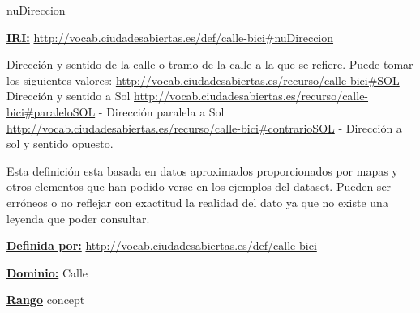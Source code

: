 \begin{mybox}{nuDireccion}
\begin{flushleft}
\underline{\textbf{IRI:}}
\url{http://vocab.ciudadesabiertas.es/def/calle-bici#nuDireccion}
\newline

Dirección y sentido de la calle o tramo de la calle a la que se refiere.
Puede tomar los siguientes valores:
\newline \url{http://vocab.ciudadesabiertas.es/recurso/calle-bici#SOL} - Dirección y sentido a Sol
\newline \url{http://vocab.ciudadesabiertas.es/recurso/calle-bici#paraleloSOL} - Dirección paralela a Sol
\newline \url{http://vocab.ciudadesabiertas.es/recurso/calle-bici#contrarioSOL} - Dirección a sol y sentido opuesto.
\newline

Esta definición esta basada en datos aproximados proporcionados por mapas y otros elementos que han podido verse en los ejemplos del dataset. Pueden ser erróneos o no reflejar con exactitud la realidad del dato ya que no existe una leyenda que poder consultar.
\newline



\underline{\textbf{Definida por:}}
\url{http://vocab.ciudadesabiertas.es/def/calle-bici}
\newline

\underline{\textbf{Dominio:}}
		Calle
\newline

\underline{\textbf{Rango}}
\newline concept

\end{flushleft}
\end{mybox}






